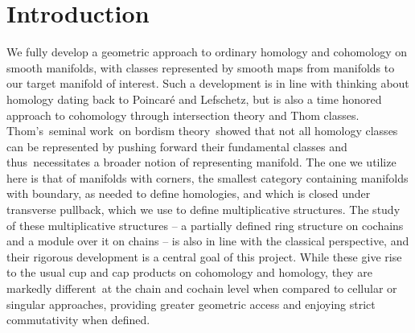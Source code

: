 
\section{Introduction}\label{intro}

We fully develop a geometric approach to ordinary homology and cohomology on smooth manifolds, with classes represented by smooth maps from manifolds to our target manifold of interest.
Such a development is in line with thinking about homology dating back to Poincar\'e and Lefschetz, but is also a time honored approach to cohomology through intersection theory and Thom classes.
Thom's seminal work on bordism theory showed that not all homology classes can be represented by pushing forward their fundamental classes and thus necessitates a broader notion of representing manifold.
The one we utilize here is that of manifolds with corners, the smallest category containing manifolds with boundary, as needed to define homologies, and which is closed under transverse pullback, which we use to define multiplicative structures.
The study of these multiplicative structures -- a partially defined ring structure on cochains and a module over it on chains -- is also in line with the classical perspective, and their rigorous development is a central goal of this project.
While these give rise to the usual cup and cap products on cohomology and homology, they are markedly different at the chain and cochain level when compared to cellular or singular approaches, providing greater geometric access and enjoying strict commutativity when defined.

